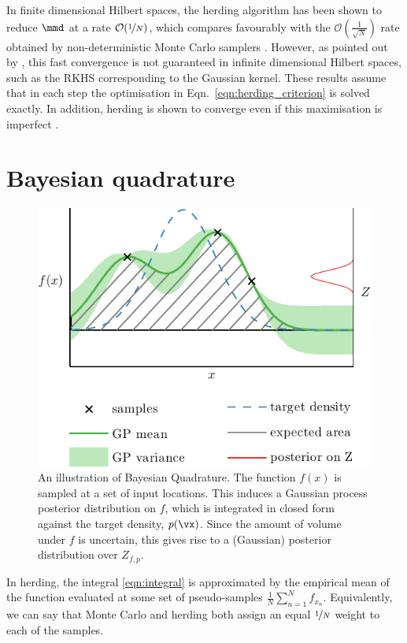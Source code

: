 In finite dimensional Hilbert spaces, the herding algorithm has been shown to reduce $\mmd$ at a rate $\mathcal{O}(\nicefrac{1}{N})$, which compares favourably with the $\mathcal{O}(\frac{1}{\sqrt{N}})$ rate obtained by non-deterministic Monte Carlo samplers \citep{Chen2010,Bach2012}. However, as pointed out by \citep{Bach2012}, this fast convergence is not guaranteed in infinite dimensional Hilbert spaces, such as the RKHS corresponding to the Gaussian kernel. These results assume that in each step the optimisation in Eqn.\ \ref{eqn:herding_criterion} is solved exactly. In addition, herding is shown to converge even if this maximisation is imperfect \citep{Gelfand2010}.


\section{Bayesian quadrature} 

\begin{figure}
\centering
\includegraphics[width=.8\columnwidth]{figs/herding/bq_intro4}
\caption[An illustration of Bayesian quadrature]{An illustration of Bayesian Quadrature. The function $f(x)$ is sampled at a set of input locations. This induces a Gaussian process posterior distribution on $f$, which is integrated in closed form against the target density, $p(\vx)$. Since the amount of volume under $f$ is uncertain, this gives rise to a (Gaussian) posterior distribution over $Z_{f,p}$.}
\label{fig:bq_intro}
\end{figure}

In herding, the integral \eqref{eqn:integral} is approximated by the empirical mean of the function evaluated at some set of pseudo-samples $\frac{1}{N}\sum_{n=1}^{N}f_{x_n}$. Equivalently, we can say that Monte Carlo and herding both assign an equal $\nicefrac{1}{N}$ weight to each of the samples.

